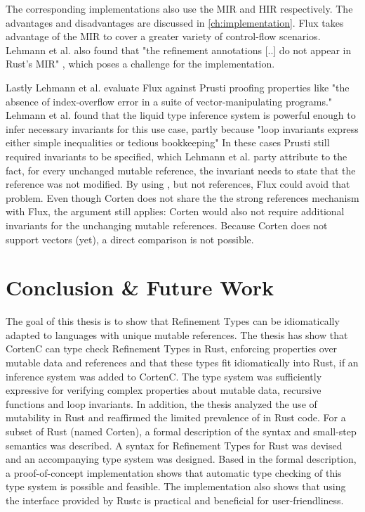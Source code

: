 \documentclass[twoside, english]{sdqthesis}
\theoremstyle{definition}
\begin{document}
The corresponding implementations also use the MIR and HIR respectively. The advantages and disadvantages are discussed in \cref{ch:implementation}. Flux takes advantage of the MIR to cover a greater variety of control-flow scenarios.
Lehmann et al. also found that "the refinement annotations [..] do not appear in Rust's MIR" \cite[p. 17]{lehmann_flux_2022}, which poses a challenge for the implementation.

Lastly Lehmann et al. evaluate Flux against Prusti proofing properties like "the absence of index-overflow error in a suite of vector-manipulating programs." \cite[p. 2]{lehmann_flux_2022}
Lehmann et al. found that the liquid type inference system is powerful enough to infer necessary invariants for this use case, partly because "loop invariants express either simple inequalities or tedious bookkeeping" \cite[p. 21]{lehmann_flux_2022}
In these cases Prusti still required invariants to be specified, which Lehmann et al. party attribute to the fact, for every unchanged mutable reference, the invariant needs to state that the reference was not modified. By using , but not  references, Flux could avoid that problem.
Even though Corten does not share the the strong references mechanism with Flux, the argument still applies: Corten would also not require additional invariants for the unchanging mutable references.
Because Corten does not support vectors (yet), a direct comparison is not possible.



\chapter{Conclusion \& Future Work} \label{ch:conclusion}

The goal of this thesis is to show that Refinement Types can be idiomatically adapted to languages with unique mutable references. 
The thesis has show that CortenC can type check Refinement Types in Rust, enforcing properties over mutable data and references and that these types fit idiomatically into Rust, if an inference system was added to CortenC.
The type system was sufficiently expressive for verifying complex properties about mutable data, recursive functions and loop invariants. 
In addition, the thesis analyzed the use of mutability in Rust and reaffirmed the limited prevalence of  in Rust code.
For a subset of Rust (named Corten), a formal description of the syntax and small-step semantics was described.
A syntax for Refinement Types for Rust was devised and an accompanying type system was designed.
Based in the formal description, a proof-of-concept implementation shows that automatic type checking of this type system is possible and feasible. The implementation also shows that using the interface provided by Rustc is practical and beneficial for user-friendliness.
\end{document}
